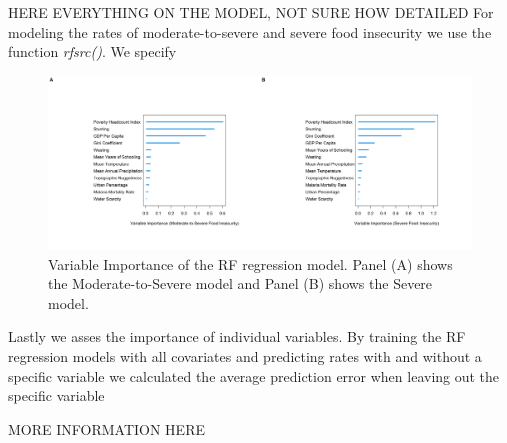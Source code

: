 \documentclass{article}
\begin{document}
HERE EVERYTHING ON THE MODEL, NOT SURE HOW DETAILED
For modeling the rates of moderate-to-severe and severe food insecurity we use the function \textit{rfsrc()}. We specify 


\begin{figure}[H]
  \centering
  \includegraphics[width=\linewidth]{img/model/vimp_rf.png}
  \caption{Variable Importance of the RF regression model. Panel (A) shows the Moderate-to-Severe model and Panel (B) shows the Severe model.}
  \label{fig:rf_vimp}
\end{figure}

Lastly we asses the importance of individual variables. By training the RF regression models with all covariates and predicting rates with and without a specific variable we calculated the average prediction error when leaving out the specific variable

MORE INFORMATION HERE
\end{document}

